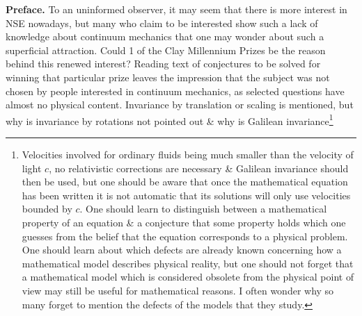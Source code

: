 \documentclass{article}
\begin{document}
\begin{enumerate}
	{\bf Preface.} To an uninformed observer, it may seem that there is more interest in NSE nowadays, but many who claim to be interested show such a lack of knowledge about continuum mechanics that one may wonder about such a superficial attraction. Could 1 of the Clay Millennium Prizes be the reason behind this renewed interest? Reading text of conjectures to be solved for winning that particular prize leaves the impression that the subject was not chosen by people interested in continuum mechanics, as selected questions have almost no physical content. Invariance by translation or scaling is mentioned, but why is invariance by rotations not pointed out \& why is Galilean invariance\footnote{Velocities involved for ordinary fluids being much smaller than the velocity of light $c$, no relativistic corrections are necessary \& Galilean invariance should then be used, but one should be aware that once the mathematical equation has been written it is not automatic that its solutions will only use velocities bounded by $c$. One should learn to distinguish between a mathematical property of an equation \& a conjecture that some property holds which one guesses from the belief that the equation corresponds to a physical problem. One should learn about which defects are already known concerning how a mathematical model describes physical reality, but one should not forget that a mathematical model which is considered obsolete from the physical point of view may still be useful for mathematical reasons. I often wonder why so many forget to mention the defects of the models that they study.
	
}
\end{enumerate}
\end{document}
